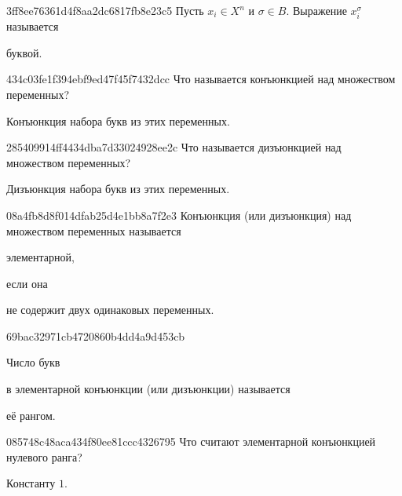 \begin{note}{3ff8ee76361d4f8aa2dc6817fb8e23c5}
    Пусть \({ x_i \in X^{n} }\) и \({ \sigma \in B }\).
    Выражение \({ x_i^{\sigma} }\) называется \begin{icloze}{1}буквой.\end{icloze}
\end{note}

\begin{note}{434c03fe1f394ebf9ed47f45f7432dcc}
    Что называется конъюнкцией над множеством переменных?

    \begin{cloze}{1}
        Конъюнкция набора букв из этих переменных.
    \end{cloze}
\end{note}

\begin{note}{285409914ff4434dba7d33024928ee2c}
    Что называется дизъюнкцией над множеством переменных?

    \begin{cloze}{1}
        Дизъюнкция набора букв из этих переменных.
    \end{cloze}
\end{note}

\begin{note}{08a4fb8d8f014dfab25d4e1bb8a7f2e3}
    Конъюнкция (или дизъюнкция) над множеством переменных называется \begin{icloze}{2}элементарной,\end{icloze} если она \begin{icloze}{1}не содержит двух одинаковых переменных.\end{icloze}
\end{note}

\begin{note}{69bac32971cb4720860b4dd4a9d453cb}
    \begin{icloze}{2}Число букв\end{icloze} в элементарной конъюнкции (или дизъюнкции) называется \begin{icloze}{1}её рангом.\end{icloze}
\end{note}

\begin{note}{085748c48aca434f80ee81ccc4326795}
    Что считают элементарной конъюнкцией нулевого ранга?

    \begin{cloze}{1}
        Константу \({ 1 }\).
    \end{cloze}
\end{note}

